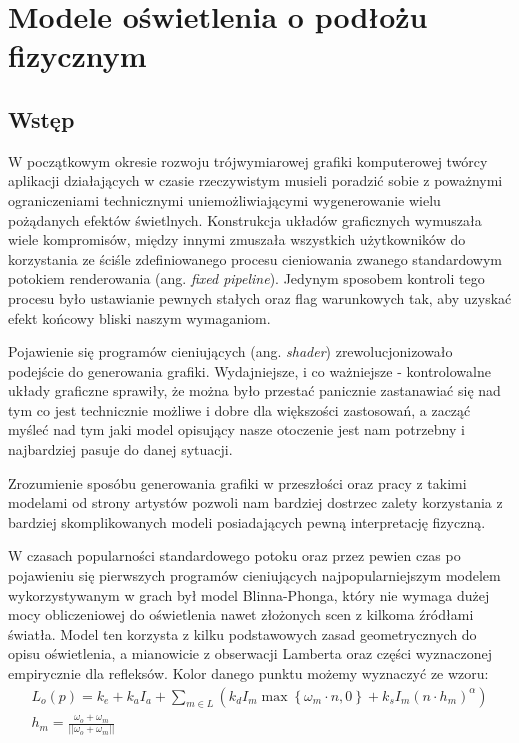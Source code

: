 \documentclass[../main.tex]{subfiles}
\begin{document}
\chapter{Modele oświetlenia o podłożu fizycznym}

\section{Wstęp}

W początkowym okresie rozwoju trójwymiarowej grafiki komputerowej twórcy aplikacji działających w czasie rzeczywistym musieli poradzić sobie z poważnymi ograniczeniami technicznymi uniemożliwiającymi wygenerowanie wielu pożądanych efektów świetlnych.
Konstrukcja układów graficznych wymuszała wiele kompromisów, między innymi zmuszała wszystkich użytkowników do korzystania ze ściśle zdefiniowanego procesu cieniowania zwanego standardowym potokiem renderowania (ang. \textit{fixed pipeline}). Jedynym sposobem kontroli tego procesu było ustawianie pewnych stałych oraz flag warunkowych tak, aby uzyskać efekt końcowy bliski naszym wymaganiom.

Pojawienie się programów cieniujących (ang. \textit{shader}) zrewolucjonizowało podejście do generowania grafiki. Wydajniejsze, i co ważniejsze - kontrolowalne układy graficzne sprawiły, że można było przestać panicznie zastanawiać się nad tym co jest technicznie możliwe i dobre dla większości zastosowań, a zacząć myśleć nad tym jaki model opisujący nasze otoczenie jest nam potrzebny i najbardziej pasuje do danej sytuacji.

Zrozumienie sposóbu generowania grafiki w przeszłości oraz pracy z takimi modelami od strony artystów pozwoli nam bardziej dostrzec zalety korzystania z bardziej skomplikowanych modeli posiadających pewną interpretację fizyczną.

W czasach popularności standardowego potoku oraz przez pewien czas po pojawieniu się pierwszych programów cieniujących najpopularniejszym modelem wykorzystywanym w grach był model Blinna-Phonga, który nie wymaga dużej mocy obliczeniowej do oświetlenia nawet złożonych scen z kilkoma źródłami światła. Model ten korzysta z kilku podstawowych zasad geometrycznych do opisu oświetlenia, a mianowicie z obserwacji Lamberta oraz części wyznaczonej empirycznie dla refleksów. Kolor danego punktu możemy wyznaczyć ze wzoru:
\begin{gather*}
  L_o(p) = 
  	k_e + 
  	k_a I_a +
    \sum_{m \in L} \left( {
      k_d I_m \max\left\{{ \omega_m \cdot n, 0 }\right\} +
      k_s I_m (n \cdot h_m)^{\alpha}
    } \right) \\
    h_m = \frac{\omega_o+\omega_m}{||\omega_o+\omega_m||}
\end{gather*}
\end{document}
